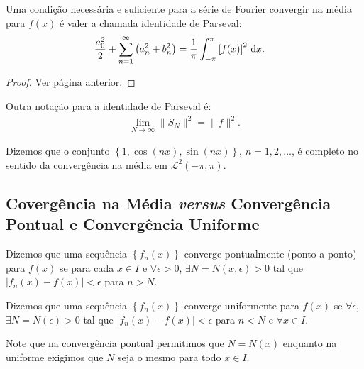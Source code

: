 \begin{teo}
    Uma condi\c{c}\~{a}o necess\'{a}ria e suficiente para a s\'{e}rie de Fourier convergir na m\'{e}dia para $f(x)$ \'{e} valer a chamada identidade de Parseval:
    \begin{align*}
        \frac{a_0^2}{2} + \sum_{n = 1}^\infty \left( a_n^2 + b_n^2 \right) &= \frac{1}{\pi} \int_{-\pi}^\pi \left[ f(x) \right]^2 \, \mathrm{d}x.
    \end{align*}
\end{teo}
\begin{proof}
    Ver p\'{a}gina anterior.
\end{proof}

Outra nota\c{c}\~{a}o para a identidade de Parseval \'{e}:
\begin{align*}
    \lim_{N \to \infty} \| S_N \|^2 = \| f \|^2.
\end{align*}

\begin{obs}
    Dizemos que o conjunto $\left\{ 1, \cos\left( n x \right), \sin\left( n x \right) \right\}$, $n = 1, 2, \ldots$, \'{e} completo no sentido da converg\^{e}ncia na m\'{e}dia em $\mathcal{L}^2(-\pi, \pi)$.
\end{obs}

\subsection{Coverg\^{e}ncia na M\'{e}dia \textit{versus} Converg\^{e}ncia Pontual e Converg\^{e}ncia Uniforme}
Dizemos que uma sequ\^{e}ncia $\left\{ f_n(x) \right\}$ converge pontualmente (ponto a ponto) para $f(x)$ se para cada $x \in I$ e $\forall \epsilon > 0$, $\exists N = N(x, \epsilon) > 0$ tal que $| f_n(x) - f(x) | < \epsilon$ para $n > N$.

Dizemos que uma sequ\^{e}ncia $\left\{ f_n(x) \right\}$ converge uniformente para $f(x)$ se $\forall \epsilon$, $\exists N = N(\epsilon) > 0$ tal que $| f_n(x) - f(x) | < \epsilon$ para $n < N$ e $\forall x \in I$.

\begin{obs}
    Note que na converg\^{e}ncia pontual permitimos que $N = N(x)$ enquanto na uniforme exigimos que $N$ seja o mesmo para todo $x \in I$.
\end{obs}

